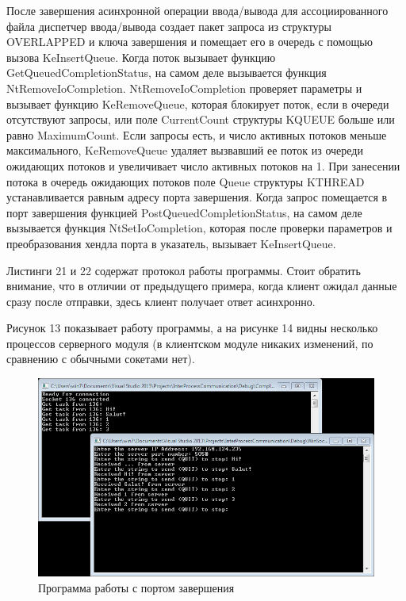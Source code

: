 \documentclass[a4paper, 12pt]{report}		%
\begin{document}
После завершения асинхронной операции ввода/вывода для ассоциированного файла диспетчер ввода/вывода создает пакет запроса из структуры OVERLAPPED и ключа завершения и помещает его в очередь с помощью вызова KeInsertQueue. Когда поток вызывает функцию GetQueuedCompletionStatus, на самом деле вызывается функция NtRemoveIoCompletion. NtRemoveIoCompletion проверяет параметры и вызывает функцию KeRemoveQueue, которая блокирует поток, если в очереди отсутствуют запросы, или поле CurrentCount структуры KQUEUE больше или равно MaximumCount. Если запросы есть, и число активных потоков меньше максимального, KeRemoveQueue удаляет вызвавший ее поток из очереди ожидающих потоков и увеличивает число активных потоков на 1. При занесении потока в очередь ожидающих потоков поле Queue структуры KTHREAD устанавливается равным адресу порта завершения. Когда запрос помещается в порт завершения функцией PostQueuedCompletionStatus, на самом деле вызывается функция NtSetIoCompletion, которая после проверки параметров и преобразования хендла порта в указатель, вызывает KeInsertQueue.

Листинги 21 и 22 содержат протокол работы программы. Стоит обратить внимание, что в отличии от предыдущего примера, когда клиент ожидал данные сразу после отправки, здесь клиент получает ответ асинхронно.





Рисунок 13 показывает работу программы, а на рисунке 14 видны несколько процессов серверного модуля (в клиентском модуле никаких изменений, по сравнению с обычными сокетами нет).

\begin{figure}[h!]
\centering
\includegraphics[scale=0.7]{res/12_Completion_Port}
\caption{Программа работы с портом завершения}
\end{figure}
\end{document}

